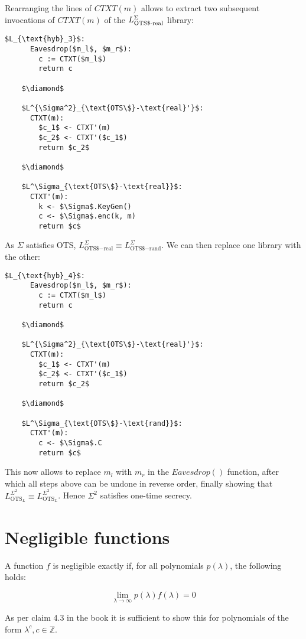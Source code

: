\documentclass[a4paper]{scrreprt}
\begin{document}
Rearranging the lines of $CTXT(m)$ allows to extract two subsequent invocations
of $CTXT(m)$ of the $L^\Sigma_{\text{OTS\textdollar-real}}$ library:

\begin{lstlisting}[mathescape=true, frame=single]
	$L_{\text{hyb}_3}$:
	  Eavesdrop($m_l$, $m_r$):
	    c := CTXT($m_l$)
	    return c

	$\diamond$

	$L^{\Sigma^2}_{\text{OTS\$}-\text{real}'}$:
	  CTXT(m):
	    $c_1$ <- CTXT'(m)
	    $c_2$ <- CTXT'($c_1$)
	    return $c_2$

	$\diamond$

	$L^\Sigma_{\text{OTS\$}-\text{real}}$:
	  CTXT'(m):
	    k <- $\Sigma$.KeyGen()
	    c <- $\Sigma$.enc(k, m)
	    return $c$
\end{lstlisting}	

As $\Sigma$ satisfies OTS, $L^\Sigma_{\text{OTS\$}-\text{real}} \equiv
L^\Sigma_{\text{OTS\$}-\text{rand}}$. We can then replace one library with the
other:

\begin{lstlisting}[mathescape=true, frame=single]
	$L_{\text{hyb}_4}$:
	  Eavesdrop($m_l$, $m_r$):
	    c := CTXT($m_l$)
	    return c

	$\diamond$

	$L^{\Sigma^2}_{\text{OTS\$}-\text{real}'}$:
	  CTXT(m):
	    $c_1$ <- CTXT'(m)
	    $c_2$ <- CTXT'($c_1$)
	    return $c_2$

	$\diamond$

	$L^\Sigma_{\text{OTS\$}-\text{rand}}$:
	  CTXT'(m):
	    c <- $\Sigma$.C
	    return $c$
\end{lstlisting}	

This now allows to replace $m_l$ with $m_r$ in the $Eavesdrop()$ function,
after which all steps above can be undone in reverse order, finally showing
that $L^{\Sigma^2}_{\text{OTS}_L} \equiv L^{\Sigma^2}_{\text{OTS}_L}$. Hence
$\Sigma^2$ satisfies one-time secrecy.

\section{Negligible functions}

A function $f$ is negligible exactly if, for all polynomials $p(\lambda)$,
the following holds:

\[
	\lim_{\lambda \rightarrow \infty} p(\lambda) f(\lambda) = 0
\]

As per claim 4.3 in the book it is sufficient to show this for polynomials of
the form $\lambda^c, c \in \mathbb{Z}$.
\end{document}
